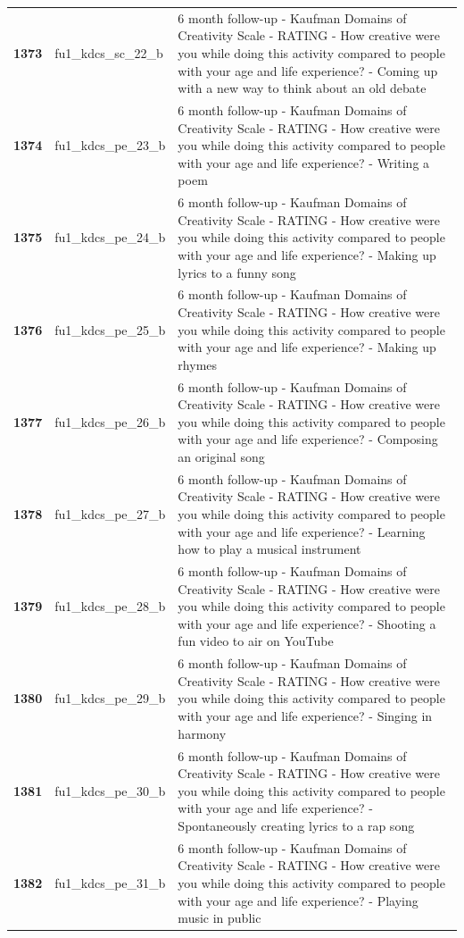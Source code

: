 \documentclass[
  letterpaper,
  DIV=11,
  numbers=noendperiod]{scrartcl}
\begin{document}
\begin{longtable}[t]{>{}cll}
\textbf{1373} & fu1\_kdcs\_sc\_22\_b & 6 month follow-up - Kaufman Domains of Creativity Scale - RATING - How creative were you while doing this activity compared to people with your age and life experience? - Coming up with a new way to think about an old debate\\
\textbf{1374} & fu1\_kdcs\_pe\_23\_b & 6 month follow-up - Kaufman Domains of Creativity Scale - RATING - How creative were you while doing this activity compared to people with your age and life experience? - Writing a poem\\
\textbf{1375} & fu1\_kdcs\_pe\_24\_b & 6 month follow-up - Kaufman Domains of Creativity Scale - RATING - How creative were you while doing this activity compared to people with your age and life experience? - Making up lyrics to a funny song\\
\addlinespace
\textbf{1376} & fu1\_kdcs\_pe\_25\_b & 6 month follow-up - Kaufman Domains of Creativity Scale - RATING - How creative were you while doing this activity compared to people with your age and life experience? - Making up rhymes\\
\textbf{1377} & fu1\_kdcs\_pe\_26\_b & 6 month follow-up - Kaufman Domains of Creativity Scale - RATING - How creative were you while doing this activity compared to people with your age and life experience? - Composing an original song\\
\textbf{1378} & fu1\_kdcs\_pe\_27\_b & 6 month follow-up - Kaufman Domains of Creativity Scale - RATING - How creative were you while doing this activity compared to people with your age and life experience? - Learning how to play a musical instrument\\
\textbf{1379} & fu1\_kdcs\_pe\_28\_b & 6 month follow-up - Kaufman Domains of Creativity Scale - RATING - How creative were you while doing this activity compared to people with your age and life experience? - Shooting a fun video to air on YouTube\\
\textbf{1380} & fu1\_kdcs\_pe\_29\_b & 6 month follow-up - Kaufman Domains of Creativity Scale - RATING - How creative were you while doing this activity compared to people with your age and life experience? - Singing in harmony\\
\addlinespace
\textbf{1381} & fu1\_kdcs\_pe\_30\_b & 6 month follow-up - Kaufman Domains of Creativity Scale - RATING - How creative were you while doing this activity compared to people with your age and life experience? - Spontaneously creating lyrics to a rap song\\
\textbf{1382} & fu1\_kdcs\_pe\_31\_b & 6 month follow-up - Kaufman Domains of Creativity Scale - RATING - How creative were you while doing this activity compared to people with your age and life experience? - Playing music in public\\

\end{longtable}
\end{document}
